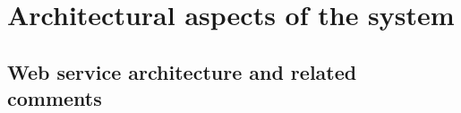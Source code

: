 \chapter{Architectural aspects of the system}\label{ch:architectural-aspects-of-the-system}


\section{Web service architecture and related comments}\label{sec:application-architecture-and-related-comments}



%


%

